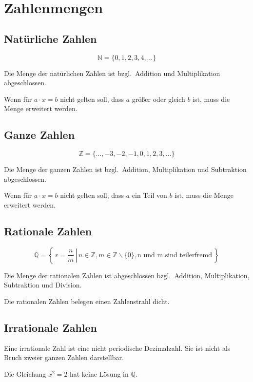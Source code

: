 \section{Zahlenmengen}

\subsection{Natürliche Zahlen}

\[
	\mathbb{N} = \{ 0, 1, 2, 3, 4, \ldots \}
\]

Die Menge der natürlichen Zahlen ist bzgl.\ Addition und Multiplikation abgeschlossen.

Wenn für \( a \cdot x = b \) nicht gelten soll, dass \( a \) größer oder gleich \( b \) ist, muss die Menge erweitert werden.

\subsection{Ganze Zahlen}

\[
	\mathbb{Z} = \{ \ldots, -3, -2, -1, 0, 1, 2, 3, \ldots \}
\]

Die Menge der ganzen Zahlen ist bzgl.\ Addition, Multiplikation und Subtraktion abgeschlossen.

Wenn für \( a \cdot x = b \) nicht gelten soll, dass \( a \) ein Teil von \( b \) ist, muss die Menge erweitert werden.

\subsection{Rationale Zahlen}

\[
	\mathbb{Q} = \left \{\, r = \left. \frac{n}{m} \, \right| \, n \in \mathbb{Z}, m \in \mathbb{Z} \backslash \{0\},
	\text{n und m sind teilerfremd} \, \right \}
\]

Die Menge der rationalen Zahlen ist abgeschlossen bzgl.\ Addition, Multiplikation, Subtraktion und Division.

Die rationalen Zahlen belegen einen Zahlenstrahl dicht.

\subsection{Irrationale Zahlen}

Eine irrationale Zahl ist eine nicht periodische Dezimalzahl.
Sie ist nicht als Bruch zweier ganzen Zahlen darstellbar.

Die Gleichung \( x^2 = 2 \) hat keine Lösung in \( \mathbb{Q} \).

